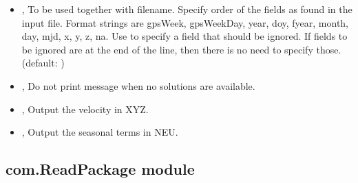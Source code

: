 \documentclass[letterpaper,10pt,english]{sphinxmanual}
\begin{document}
\begin{itemize}
\item {} 
\sphinxAtStartPar
{\hyperref[\detokenize{com:QueryETM.py--format}]{}} , {\hyperref[\detokenize{com:QueryETM.py---format}]{}}  \sphinxhyphen{} To be used together with \textendash{}filename. Specify order of the fields as found in the input file. Format strings are gpsWeek, gpsWeekDay, year, doy, fyear, month, day, mjd, x, y, z, na. Use  to specify a field that should be ignored. If fields to be ignored are at the end of the line, then there is no need to specify those. (default: )

\item {} 
\sphinxAtStartPar
{\hyperref[\detokenize{com:QueryETM.py--quiet}]{}}, {\hyperref[\detokenize{com:QueryETM.py---quiet}]{}} \sphinxhyphen{} Do not print message when no solutions are available.

\item {} 
\sphinxAtStartPar
{\hyperref[\detokenize{com:QueryETM.py--vel}]{}}, {\hyperref[\detokenize{com:QueryETM.py---velocity}]{}} \sphinxhyphen{} Output the velocity in XYZ.

\item {} 
\sphinxAtStartPar
{\hyperref[\detokenize{com:QueryETM.py--seasonal}]{}}, {\hyperref[\detokenize{com:QueryETM.py---seasonal_terms}]{}} \sphinxhyphen{} Output the seasonal terms in NEU.

\end{itemize}


\subsection{com.ReadPackage module}
\label{\detokenize{com:module-com.ReadPackage}}\label{\detokenize{com:com-readpackage-module}}
\end{document}
